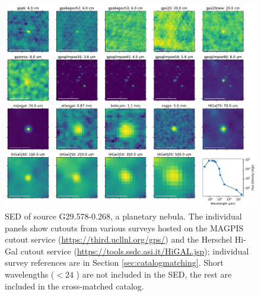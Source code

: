 \documentclass[twocolumn]{aastex62}
\begin{document}
\begin{figure}[htp]
\includegraphics[width=17cm]{figures/SED_plot_G29_G29.578-0.268.pdf}
\caption{SED of source G29.578-0.268, a planetary nebula.  The individual panels show cutouts from 
various surveys hosted on the MAGPIS cutout service
(\url{https://third.ucllnl.org/gps/}) and the Herschel Hi-Gal cutout service
(\url{https://tools.ssdc.asi.it/HiGAL.jsp}); individual survey references are in Section \ref{sec:catalogmatching}.
Short wavelengths ($<24$ \um) are not included in the SED, the rest are included in the cross-matched catalog.}
\label{fig:g29pn}
\end{figure}
\end{document}
